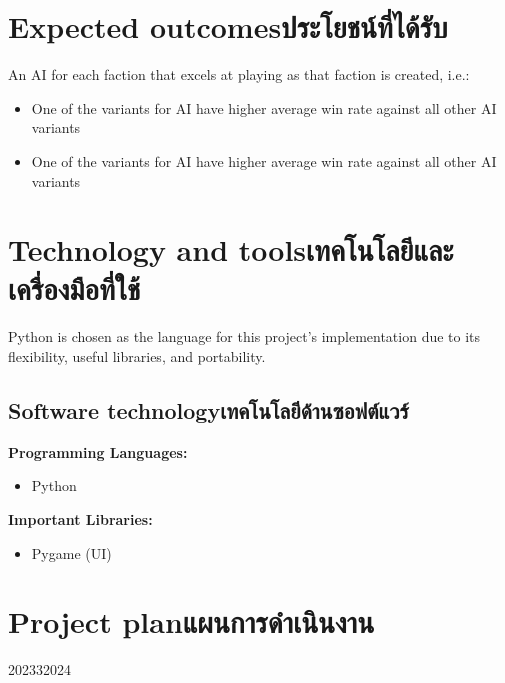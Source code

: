 \section{\ifenglish Expected outcomes\else ประโยชน์ที่ได้รับ\fi}
An AI for each faction that excels at playing as that faction is created, i.e.:
\begin{itemize}
    \item One of the variants for \Marquise{} AI have higher average win rate   against all other \Eyrie{} AI variants
    \item One of the variants for \Eyrie{} AI have higher average win rate against all other \Marquise{} AI variants
\end{itemize}

\section{\ifenglish Technology and tools\else เทคโนโลยีและเครื่องมือที่ใช้\fi}
Python is chosen as the language for this project's implementation due to its flexibility, useful libraries, and portability.


\subsection{\ifenglish Software technology\else เทคโนโลยีด้านซอฟต์แวร์\fi}
\textbf{Programming Languages:}
\begin{itemize}
    \item Python
\end{itemize}
\textbf{Important Libraries:}
\begin{itemize}
    \item Pygame (UI) 
\end{itemize}

\section{\ifenglish Project plan\else แผนการดำเนินงาน\fi}

\begin{plan}{6}{2023}{3}{2024}
\end{plan}

